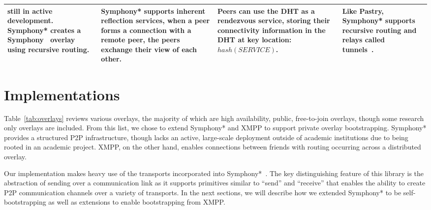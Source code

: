 \documentclass[conference]{IEEEtran}
\begin{document}
\begin{table*}[h!t!]
\begin{tabular}[c]{|m{1.5cm}||m{5.5cm}|m{3cm}|m{3cm}|m{3cm}|}
still in active development.  Symphony* creates a Symphony~\cite{symphony} overlay
using recursive routing.
&
Symphony* supports inherent reflection services, when a peer forms a connection
with a remote peer, the peers exchange their view of each other.
&
Peers can use the DHT as a rendezvous service, storing their connectivity
information in the DHT at key location:  $hash(SERVICE)$.
&
Like Pastry, Symphony* supports recursive routing and relays called
tunnels~\cite{hpdc08_0}.
\\ \hline
\end{tabular}
\caption{Public and Research Overlays}
\label{tab:overlays}
\end{table*}

\section{Implementations}
\label{implementation}

Table~\ref{tab:overlays} reviews various overlays, the majority of which are
high availability, public, free-to-join overlays, though some research only
overlays are included.  From this list, we chose to extend Symphony* and XMPP to
support private overlay bootstrapping.  Symphony* provides a structured P2P
infrastructure, though lacks an active, large-scale deployment outside of
academic institutions due to being rooted in an academic project.  XMPP, on the
other hand, enables connections between friends with routing occurring across a
distributed overlay.

Our implementation makes heavy use of the transports incorporated into
Symphony*~\cite{brunet}.  The key distinguishing feature of this library is the
abstraction of sending over a communication link as it supports primitives
similar to ``send'' and ``receive'' that enables the ability to create P2P
communication channels over a variety of transports.  In the next sections, we
will describe how we extended Symphony* to be self-bootstrapping as well as
extensions to enable bootstrapping from XMPP.
\end{document}

